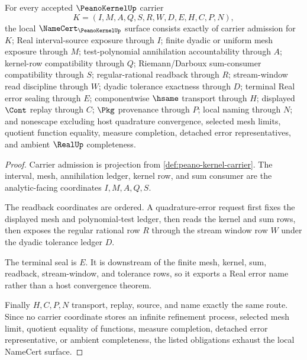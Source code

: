 \begin{theorem}
\label{thm:peano-kernel-namecert-obligations}
For every accepted $\PeanoKernelUp$ carrier
$$
K=(I,M,A,Q,S,R,W,D,E,H,C,P,N),
$$
the local $\NameCert_{\PeanoKernelUp}$ surface consists exactly of carrier admission for $K$; Real interval-source exposure through $I$; finite dyadic or uniform mesh exposure through $M$; test-polynomial annihilation accountability through $A$; kernel-row compatibility through $Q$; Riemann/Darboux sum-consumer compatibility through $S$; regular-rational readback through $R$; stream-window read discipline through $W$; dyadic tolerance exactness through $D$; terminal Real error sealing through $E$; componentwise $\hsame$ transport through $H$; displayed $\Cont$ replay through $C$; $\Pkg$ provenance through $P$; local naming through $N$; and nonescape excluding host quadrature convergence, selected mesh limits, quotient function equality, measure completion, detached error representatives, and ambient $\RealUp$ completeness.
\end{theorem}
\begin{proof}
Carrier admission is projection from \autoref{def:peano-kernel-carrier}. The interval, mesh, annihilation ledger, kernel row, and sum consumer are the analytic-facing coordinates $I,M,A,Q,S$.

The readback coordinates are ordered. A quadrature-error request first fixes the displayed mesh and polynomial-test ledger, then reads the kernel and sum rows, then exposes the regular rational row $R$ through the stream window row $W$ under the dyadic tolerance ledger $D$.

The terminal seal is $E$. It is downstream of the finite mesh, kernel, sum, readback, stream-window, and tolerance rows, so it exports a Real error name rather than a host convergence theorem.

Finally $H,C,P,N$ transport, replay, source, and name exactly the same route. Since no carrier coordinate stores an infinite refinement process, selected mesh limit, quotient equality of functions, measure completion, detached error representative, or ambient completeness, the listed obligations exhaust the local NameCert surface.
\end{proof}


